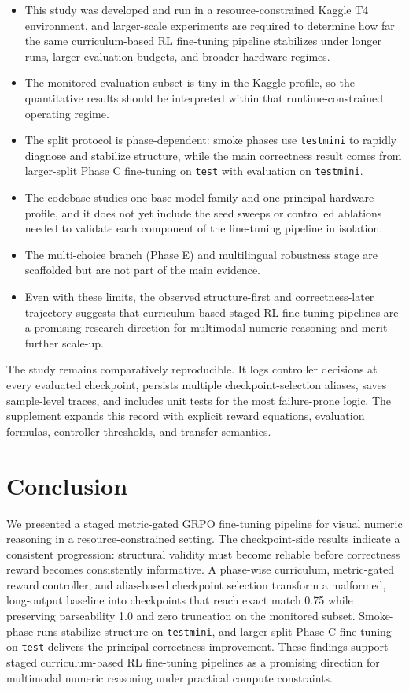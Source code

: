 \documentclass{article} %
\begin{document}
\begin{itemize}[leftmargin=1.2em]
\item This study was developed and run in a resource-constrained Kaggle T4 environment, and larger-scale experiments are required to determine how far the same curriculum-based RL fine-tuning pipeline stabilizes under longer runs, larger evaluation budgets, and broader hardware regimes.
\item The monitored evaluation subset is tiny in the Kaggle profile, so the quantitative results should be interpreted within that runtime-constrained operating regime.
\item The split protocol is phase-dependent: smoke phases use \texttt{testmini} to rapidly diagnose and stabilize structure, while the main correctness result comes from larger-split Phase C fine-tuning on \texttt{test} with evaluation on \texttt{testmini}.
\item The codebase studies one base model family and one principal hardware profile, and it does not yet include the seed sweeps or controlled ablations needed to validate each component of the fine-tuning pipeline in isolation.
\item The multi-choice branch (Phase E) and multilingual robustness stage are scaffolded but are not part of the main evidence.
\item Even with these limits, the observed structure-first and correctness-later trajectory suggests that curriculum-based staged RL fine-tuning pipelines are a promising research direction for multimodal numeric reasoning and merit further scale-up.
\end{itemize}

The study remains comparatively reproducible. It logs controller decisions at every evaluated checkpoint, persists multiple checkpoint-selection aliases, saves sample-level traces, and includes unit tests for the most failure-prone logic. The supplement expands this record with explicit reward equations, evaluation formulas, controller thresholds, and transfer semantics.

\section{Conclusion}

We presented a staged metric-gated GRPO fine-tuning pipeline for visual numeric reasoning in a resource-constrained setting. The checkpoint-side results indicate a consistent progression: structural validity must become reliable before correctness reward becomes consistently informative. A phase-wise curriculum, metric-gated reward controller, and alias-based checkpoint selection transform a malformed, long-output baseline into checkpoints that reach exact match 0.75 while preserving parseability 1.0 and zero truncation on the monitored subset. Smoke-phase runs stabilize structure on \texttt{testmini}, and larger-split Phase C fine-tuning on \texttt{test} delivers the principal correctness improvement. These findings support staged curriculum-based RL fine-tuning pipelines as a promising direction for multimodal numeric reasoning under practical compute constraints.



\end{document}
